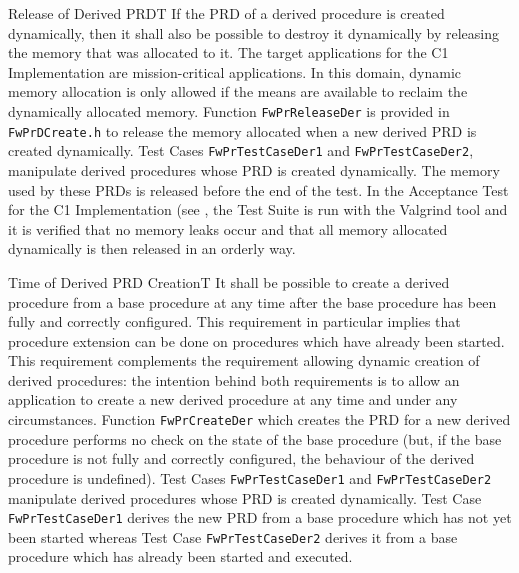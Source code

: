 \documentclass[a4paper,10pt]{article}
\newenvironment{fw_req}[6]
{\addtocounter{subsubsection}{1}
	\hspace{0.2cm}\textbf{FW-\arabic{section}.\arabic{subsection}.\arabic{subsubsection}/#2
	\hspace{0.8cm} #1}
	\vspace{-10pt}
\begin{longtable}{p{2.7cm}P{8.5cm}}
\hline
\textsc{Requirement} & #3 \\
\textsc{Justification} & #4 \\
\textsc{Implementation} & #5  \\ 
\textsc{Verification} & #6  \\
\hline
}
{\end{longtable}}
\newenvironment{fw_req_note}[7]
{\addtocounter{subsubsection}{1}
	\hspace{0.2cm}\textbf{FW-\arabic{section}.\arabic{subsection}.\arabic{subsubsection}/#2
	\hspace{0.8cm} #1}
	\vspace{-10pt}
\begin{longtable}{p{2.7cm}P{8.5cm}}
\hline
\textsc{Requirement} & #3 \\
\textsc{Note} & #4 \\
\textsc{Justification} & #5 \\
\textsc{Implementation} & #6  \\ 
\textsc{Verification} & #7  \\
\hline
}
{\end{longtable}}
\begin{document}
\begin{fw_req}{Release of Derived PRD}{T}
{If the PRD of a derived procedure is created dynamically, then it shall also be possible to destroy it dynamically by releasing the memory that was allocated to it.}
{The target applications for the C1 Implementation are mission-critical applications. In this domain, dynamic memory allocation is only allowed if the means are available to reclaim the dynamically allocated memory.}
{Function \texttt{FwPrReleaseDer} is provided in \texttt{FwPrDCreate.h} to release the memory allocated when a new derived PRD is created dynamically.} 
{Test Cases \texttt{FwPrTestCaseDer1} and \texttt{FwPrTestCaseDer2},
manipulate derived procedures whose PRD is created dynamically. 
The memory used by these PRDs is released before the end of the test. 
In the Acceptance Test for the C1 Implementation (see \cite{ref:um}, the Test Suite is run 
with the Valgrind tool and it is verified that no memory leaks occur and 
that all memory allocated dynamically is then released in an orderly way.}
\end{fw_req}


\begin{fw_req_note}{Time of Derived PRD Creation}{T}
{It shall be possible to create a derived procedure from a base procedure at any time after the base procedure has been fully and correctly configured.}
{This requirement in particular implies that procedure extension can be done on procedures which have already been started.}
{This requirement complements the requirement allowing dynamic creation of derived procedures: the intention behind 
both requirements is to allow an application to create a new derived procedure at any time and under any circumstances.}
{Function \texttt{FwPrCreateDer} which creates the PRD for a new derived procedure performs no check on the state of the 
base procedure (but, if the base procedure is not fully and correctly configured, the behaviour of the derived procedure is undefined).} 
{Test Cases \texttt{FwPrTestCaseDer1} and \texttt{FwPrTestCaseDer2}
manipulate derived procedures whose PRD is created dynamically. 
Test Case \texttt{FwPrTestCaseDer1} derives the new PRD from a base procedure which has not yet been started 
whereas Test Case \texttt{FwPrTestCaseDer2} 
derives it from a base procedure which has already been started and executed.}
\end{fw_req_note}
\end{document}
